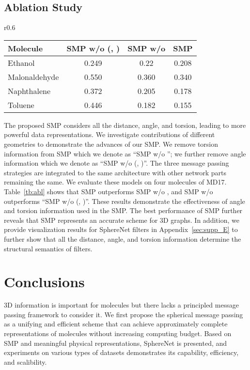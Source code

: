 \documentclass{article}
\begin{document}
\subsection{Ablation Study}

\begin{wraptable}[9]{r}{0.6\textwidth}
\vspace{-20pt} \centering 
\caption{Comparisons among three message passing strategies
on the same SphereNet architecture
on the partial MD17 dataset.
}\label{tb:abl}
\setlength{\tabcolsep}{1.6mm}
\begin{tabular}{lc c c}
\bottomrule Molecule &  SMP w/o (, )&   SMP w/o  
& SMP\\
\hline
Ethanol &  0.249& 0.22& 0.208\\
Malonaldehyde  &  0.550& 0.360& 0.340\\
Naphthalene &  0.372& 0.205& 0.178\\
Toluene  &  0.446& 0.182& 0.155\\
\bottomrule
\end{tabular}
\end{wraptable}
The proposed SMP considers all the distance, angle, and torsion, leading to more powerful data representations.
We investigate contributions of different geometries to demonstrate the advances of our SMP.
We remove torsion information from SMP which we denote as
``SMP w/o '';
we further remove angle information which we denote as
``SMP w/o (, )''.
The three message passing strategies are integrated to the same architecture with other network parts remaining the same.
We evaluate these models on four molecules 
of MD17.
Table~\ref{tb:abl} shows
that SMP outperforms SMP w/o , and SMP w/o 
outperforms ``SMP w/o (, )''.
These results demonstrate the effectiveness of angle and torsion information used in the SMP.
The best performance of SMP further reveals
that SMP represents an accurate scheme for 3D graphs.
In addition, we provide visualization results
for SphereNet filters in Appendix~\ref{sec:supp_E}
to further show that
all the distance, angle, and torsion information
determine the structural semantics of filters.





\section{Conclusions} \label{sec:conc}
3D information is important for molecules
but there lacks a principled message passing framework to consider it.
We first propose the
spherical message passing as a unifying and efficient
scheme that can achieve approximately complete representations of molecules
without increasing computing budget.
Based on SMP and meaningful physical representations,
SphereNet is presented,
and experiments on various types of datasets demonstrates its
capability, efficiency, and scalibility.
\end{document}
